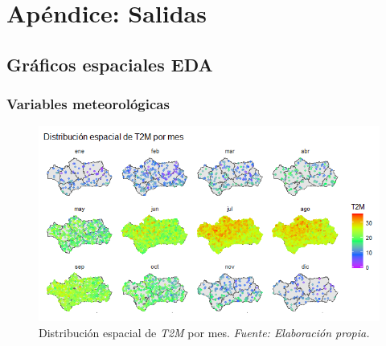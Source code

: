 \documentclass[12pt,a4paper,]{book}
\title{}
\author{Nombre Completo Autor}
\date{18/11/2021}
\def\ifdoblecara{} %
\def\ifprincipal{} %
\let\ifprincipal\undefined %
\numberwithin{dummy}{section}
\theoremstyle{ocrenumbox}
\theoremstyle{blacknumex}
\theoremstyle{blacknumbox}
\theoremstyle{ocrenum}
\theoremstyle{ocrenum}
\begin{document}




\raggedbottom

\ifdefined\ifprincipal
\else
\setlength{\parindent}{1em}
\pagestyle{fancy}
\setcounter{tocdepth}{4}
\tableofcontents

\fi

\ifdefined\ifdoblecara
\fancyhead{}{}
\fancyhead[LE,RO]{\scriptsize\rightmark}
\fancyfoot[LO,RE]{\scriptsize\slshape \leftmark}
\fancyfoot[C]{}
\fancyfoot[LE,RO]{\footnotesize\thepage}
\else
\fancyhead{}{}
\fancyhead[RO]{\scriptsize\rightmark}
\fancyfoot[LO]{\scriptsize\slshape \leftmark}
\fancyfoot[C]{}
\fancyfoot[RO]{\footnotesize\thepage}
\fi

\renewcommand{\headrulewidth}{0.4pt}
\renewcommand{\footrulewidth}{0.4pt}

\hypertarget{apuxe9ndice-salidas}{%
\chapter{Apéndice: Salidas}\label{apuxe9ndice-salidas}}

\hypertarget{gruxe1ficos-espaciales-eda}{%
\section{Gráficos espaciales EDA}\label{gruxe1ficos-espaciales-eda}}

\hypertarget{variables-meteoroluxf3gicas}{%
\subsection{Variables
meteorológicas}\label{variables-meteoroluxf3gicas}}

\begin{figure}[H]
\centering
\includegraphics[width = \textwidth]{graficos/T2M_spat.png}
\caption[Distribución espacial de \textit{T2M} por mes]{Distribución espacial de \textit{T2M} por mes. \it Fuente: Elaboración propia.}
\label{fig:T2M_spat}
\end{figure}
\end{document}
